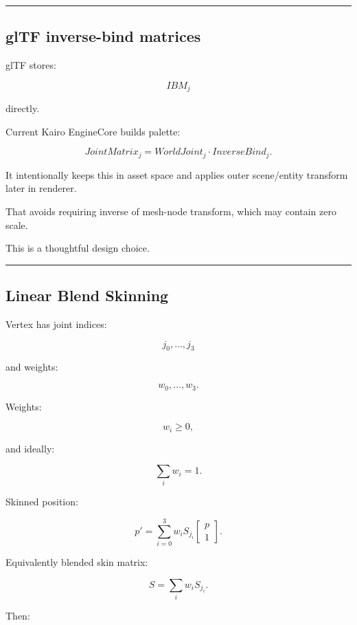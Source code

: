 \begin{center}\rule{0.5\linewidth}{0.5pt}\end{center}

\subsection{glTF inverse-bind matrices}\label{04-visual-computing-ii-ch041-gltf-inverse-bind-matrices}

glTF stores:

\[
IBM_j
\]

directly.

Current Kairo EngineCore builds palette:

\[
\boxed{
JointMatrix_j
=
WorldJoint_j
\cdot
InverseBind_j.
}
\]

It intentionally keeps this in asset space and applies outer scene/entity transform later in renderer.

That avoids requiring inverse of mesh-node transform, which may contain zero scale.

This is a thoughtful design choice.

\begin{center}\rule{0.5\linewidth}{0.5pt}\end{center}

\subsection{Linear Blend Skinning}\label{04-visual-computing-ii-ch041-linear-blend-skinning}

Vertex has joint indices:

\[
j_0,\dots,j_3
\]

and weights:

\[
w_0,\dots,w_3.
\]

Weights:

\[
w_i\ge0,
\]

and ideally:

\[
\boxed{
\sum_iw_i=1.
}
\]

Skinned position:

\[
\boxed{
p'
=
\sum_{i=0}^{3}
w_i
S_{j_i}
\begin{bmatrix}
p\\1
\end{bmatrix}.
}
\]

Equivalently blended skin matrix:

\[
S=
\sum_iw_iS_{j_i}.
\]

Then:

